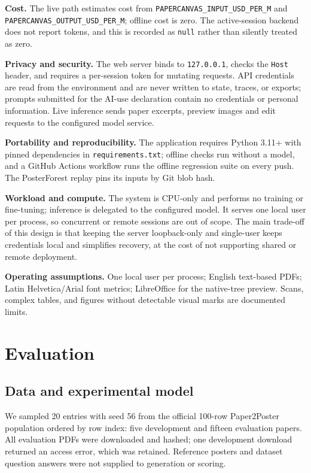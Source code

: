 \documentclass{article}
\begin{document}
\textbf{Cost.} The live path estimates cost from \texttt{PAPERCANVAS\_INPUT\_USD\_PER\_M} and \texttt{PAPERCANVAS\_OUTPUT\_USD\_PER\_M}; offline cost is zero. The active-session backend does not report tokens, and this is recorded as \texttt{null} rather than silently treated as zero.

\textbf{Privacy and security.} The web server binds to \texttt{127.0.0.1}, checks the \texttt{Host} header, and requires a per-session token for mutating requests. API credentials are read from the environment and are never written to state, traces, or exports; prompts submitted for the AI-use declaration contain no credentials or personal information. Live inference sends paper excerpts, preview images and edit requests to the configured model service.

\textbf{Portability and reproducibility.} The application requires Python 3.11+ with pinned dependencies in \texttt{requirements.txt}; offline checks run without a model, and a GitHub Actions workflow runs the offline regression suite on every push. The PosterForest replay pins its inputs by Git blob hash.

\textbf{Workload and compute.} The system is CPU-only and performs no training or fine-tuning; inference is delegated to the configured model. It serves one local user per process, so concurrent or remote sessions are out of scope. The main trade-off of this design is that keeping the server loopback-only and single-user keeps credentials local and simplifies recovery, at the cost of not supporting shared or remote deployment.

\textbf{Operating assumptions.} One local user per process; English text-based PDFs; Latin Helvetica/Arial font metrics; LibreOffice for the native-tree preview. Scans, complex tables, and figures without detectable visual marks are documented limits.

\section{Evaluation}
\label{sec:batch}

\subsection{Data and experimental model}
We sampled 20 entries with seed 56 from the official 100-row Paper2Poster population ordered by row index: five development and fifteen evaluation papers. All evaluation PDFs were downloaded and hashed; one development download returned an access error, which was retained. Reference posters and dataset question answers were not supplied to generation or scoring.
\end{document}
